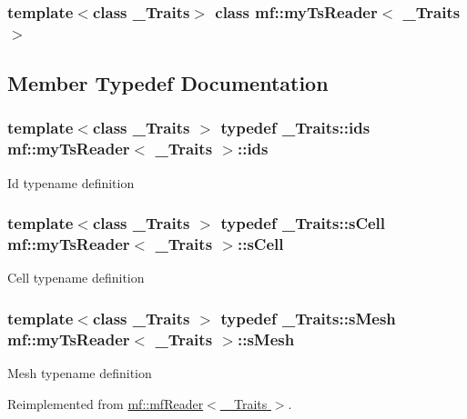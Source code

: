 \subsubsection*{template$<$class \_\-Traits$>$ class mf::myTsReader$<$ \_\-Traits $>$}



\subsection{Member Typedef Documentation}
\hypertarget{classmf_1_1myTsReader_ad3ffe55514e0229db84f085cc1d88c99}{
\subsubsection[{ids}]{\setlength{\rightskip}{0pt plus 5cm}template$<$class \_\-Traits $>$ typedef \_\-Traits::ids {\bf mf::myTsReader}$<$ \_\-Traits $>$::{\bf ids}}}
\label{classmf_1_1myTsReader_ad3ffe55514e0229db84f085cc1d88c99}
Id typename definition \hypertarget{classmf_1_1myTsReader_a38e884b502c798830b1598e6f56f97bc}{
\subsubsection[{sCell}]{\setlength{\rightskip}{0pt plus 5cm}template$<$class \_\-Traits $>$ typedef \_\-Traits::sCell {\bf mf::myTsReader}$<$ \_\-Traits $>$::{\bf sCell}}}
\label{classmf_1_1myTsReader_a38e884b502c798830b1598e6f56f97bc}
Cell typename definition \hypertarget{classmf_1_1myTsReader_a2b17f65a22359c58f4cbf59b289a3284}{
\subsubsection[{sMesh}]{\setlength{\rightskip}{0pt plus 5cm}template$<$class \_\-Traits $>$ typedef \_\-Traits::sMesh {\bf mf::myTsReader}$<$ \_\-Traits $>$::{\bf sMesh}}}
\label{classmf_1_1myTsReader_a2b17f65a22359c58f4cbf59b289a3284}
Mesh typename definition 

Reimplemented from \hyperlink{classmf_1_1mfReader}{mf::mfReader$<$ \_\-Traits $>$}.

